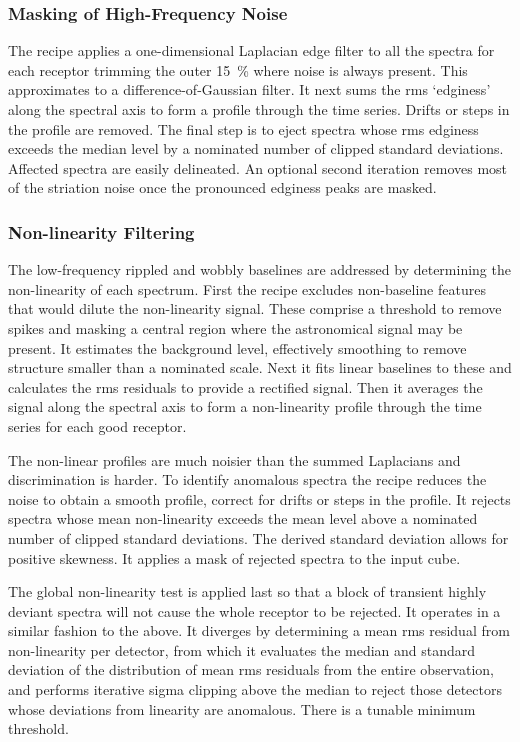 \documentclass[final,authoryear,5p,times,twocolumn]{elsarticle}
\begin{document}
\subsubsection{Masking of High-Frequency Noise}

The recipe applies a one-dimensional Laplacian edge filter to all the
spectra for each receptor trimming the outer 15~\% where noise is
always present.  This approximates to a difference-of-Gaussian
filter. It next sums the rms `edginess' along the spectral axis to
form a profile through the time series.  Drifts or steps in the
profile are removed.  The final step is to eject spectra whose rms
edginess exceeds the median level by a nominated number of clipped
standard deviations.  Affected spectra are easily delineated.  An
optional second iteration removes most of the striation noise once the
pronounced edginess peaks are masked.

\subsubsection{Non-linearity Filtering}

The low-frequency rippled and wobbly baselines are addressed by
determining the non-linearity of each spectrum.  First the recipe
excludes non-baseline features that would dilute the non-linearity
signal.  These comprise a threshold to remove spikes and masking a
central region where the astronomical signal may be present. It
estimates the background level, effectively smoothing to remove
structure smaller than a nominated scale.  Next it fits linear
baselines to these and calculates the rms residuals to provide a
rectified signal.  Then it averages the signal along the spectral axis
to form a non-linearity profile through the time series for each good
receptor.

The non-linear profiles are much noisier than the summed Laplacians
and discrimination is harder.  To identify anomalous spectra the
recipe reduces the noise to obtain a smooth profile, correct for
drifts or steps in the profile.  It rejects spectra whose mean
non-linearity exceeds the mean level above a nominated number of
clipped standard deviations.  The derived standard deviation allows
for positive skewness.  It applies a mask of rejected spectra to the
input cube.

The global non-linearity test is applied last so that a block of
transient highly deviant spectra will not cause the whole receptor to
be rejected.  It operates in a similar fashion to the above.  It
diverges by determining a mean rms residual from non-linearity per
detector, from which it evaluates the median and standard deviation of
the distribution of mean rms residuals from the entire observation,
and performs iterative sigma clipping above the median to reject those
detectors whose deviations from linearity are anomalous.  There is a
tunable minimum threshold.
\end{document}
